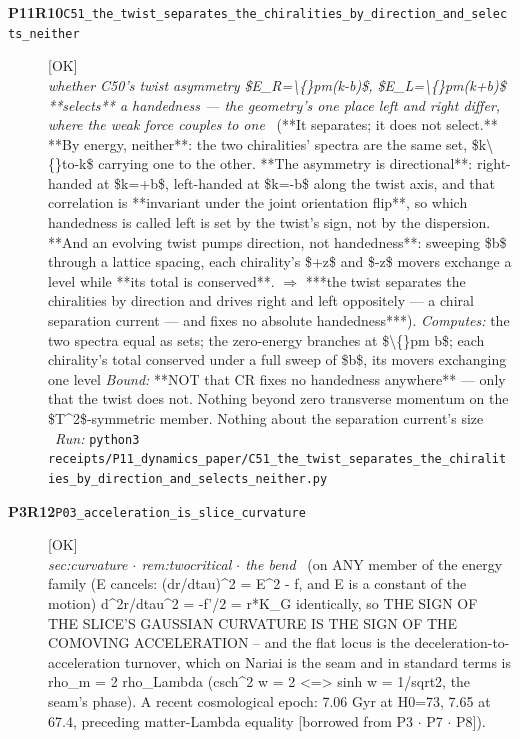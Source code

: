 \begin{description}
\item[\textbf{P11R10}\quad\texttt{C51\_the\_twist\_separates\_the\_chiralities\_by\_direction\_and\_selects\_neither}]\hfill\textsf{[OK]}\\
\textit{whether C50's twist asymmetry \$E\_R=\textbackslash\{\}pm(k-b)\$, \$E\_L=\textbackslash\{\}pm(k+b)\$ **selects** a handedness --- the geometry's one place left and right differ, where the weak force couples to one} \ (**It separates; it does not select.**  **By energy, neither**: the two chiralities' spectra are the same set, \$k\textbackslash\{\}to-k\$ carrying one to the other.  **The asymmetry is directional**: right-handed at \$k=+b\$, left-handed at \$k=-b\$ along the twist axis, and that correlation is **invariant under the joint orientation flip**, so which handedness is called left is set by the twist's sign, not by the dispersion.  **And an evolving twist pumps direction, not handedness**: sweeping \$b\$ through a lattice spacing, each chirality's \$+z\$ and \$-z\$ movers exchange a level while **its total is conserved**. \ensuremath{\Rightarrow} ***the twist separates the chiralities by direction and drives right and left oppositely --- a chiral separation current --- and fixes no absolute handedness***). 
\emph{Computes:} the two spectra equal as sets; the zero-energy branches at \$\textbackslash\{\}pm b\$; each chirality's total conserved under a full sweep of \$b\$, its movers exchanging one level
 \emph{Bound:}  **NOT that CR fixes no handedness anywhere** --- only that the twist does not. Nothing beyond zero transverse momentum on the \$T\textasciicircum{}2\$-symmetric member. Nothing about the separation current's size
\ \emph{Run:} \texttt{python3 receipts/P11\_dynamics\_paper/C51\_the\_twist\_separates\_the\_chiralities\_by\_direction\_and\_selects\_neither.py}
\item[\textbf{P3R12}\quad\texttt{P03\_acceleration\_is\_slice\_curvature}]\hfill\textsf{[OK]}\\
\textit{sec:curvature \ensuremath{\cdot} rem:twocritical \ensuremath{\cdot} the bend} \ (on ANY member of the energy family (E cancels: (dr/dtau)\textasciicircum{}2 = E\textasciicircum{}2 - f, and E is a constant of the motion) d\textasciicircum{}2r/dtau\textasciicircum{}2 = -f'/2 = r*K\_G identically, so THE SIGN OF THE SLICE'S GAUSSIAN CURVATURE IS THE SIGN OF THE COMOVING ACCELERATION -- and the flat locus is the deceleration-to-acceleration turnover, which on Nariai is the seam and in standard terms is rho\_m = 2 rho\_Lambda (csch\textasciicircum{}2 w = 2 <=> sinh w = 1/sqrt2, the seam's phase). A recent cosmological epoch: 7.06 Gyr at H0=73, 7.65 at 67.4, preceding matter-Lambda equality [borrowed from P3 \ensuremath{\cdot} P7 \ensuremath{\cdot} P8]). 

\end{description}
